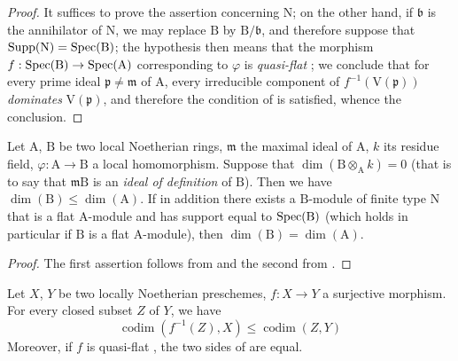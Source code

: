 \begin{proof}
It suffices to prove the assertion concerning $\mathrm{N}$; on the other hand, if $\mathfrak{b}$ is the annihilator of $\mathrm{N}$, we may replace $\mathrm{B}$ by $\mathrm{B}/\mathfrak{b}$, and therefore suppose that $\operatorname{Supp}(\mathrm{N})=\operatorname{Spec}(\mathrm{B})$; the hypothesis then means that the morphism $f:\operatorname{Spec}(\mathrm{B})\to\operatorname{Spec}(\mathrm{A})$ corresponding to $\varphi$ is \emph{quasi-flat} ; we conclude  that for every prime ideal $\mathfrak{p}\neq\mathfrak{m}$ of $\mathrm{A}$,
every irreducible component of $f^{-1}(\mathrm{V}(\mathfrak{p}))$ \emph{dominates} $\mathrm{V}(\mathfrak{p})$, and therefore the condition of  is satisfied, whence the conclusion.
\end{proof}

\begin{corollary}[6.1.3]
\label{IV.6.1.3}
Let $\mathrm{A}$, $\mathrm{B}$ be two local Noetherian rings, $\mathfrak{m}$ the maximal ideal of $\mathrm{A}$, $k$ its residue field, $\varphi:\mathrm{A}\to\mathrm{B}$ a local homomorphism.
Suppose that $\dim(\mathrm{B}\otimes_\mathrm{A} k)=0$ \textup{(that is to say  that $\mathfrak{m}\mathrm{B}$ is an \emph{ideal of definition} of $\mathrm{B}$)}.
Then we have $\dim(\mathrm{B})\leqslant\dim(\mathrm{A})$.
If in addition there exists a $\mathrm{B}$-module of finite type $\mathrm{N}$ that is a flat $\mathrm{A}$-module and has support equal to $\operatorname{Spec}(\mathrm{B})$ \textup{(which holds in particular if $\mathrm{B}$ is a} flat \textup{$\mathrm{A}$-module}), then $\dim(\mathrm{B})=\dim(\mathrm{A})$.
\end{corollary}

\begin{proof}
The first assertion follows from  and the second from .
\end{proof}

\begin{corollary}[6.1.4]
\label{IV.6.1.4}
Let $X$, $Y$ be two locally Noetherian preschemes, $f:X\to Y$ a surjective morphism.
For every closed subset $Z$ of $Y$, we have
\begin{equation}
  \operatorname{codim}(f^{-1}(Z),X)\leqslant\operatorname{codim}(Z,Y)
  \label{IV.6.1.4.1}
\tag{6.1.4.1}
\end{equation}
Moreover, if $f$ is quasi-flat , the two sides of  are equal.
\end{corollary}

